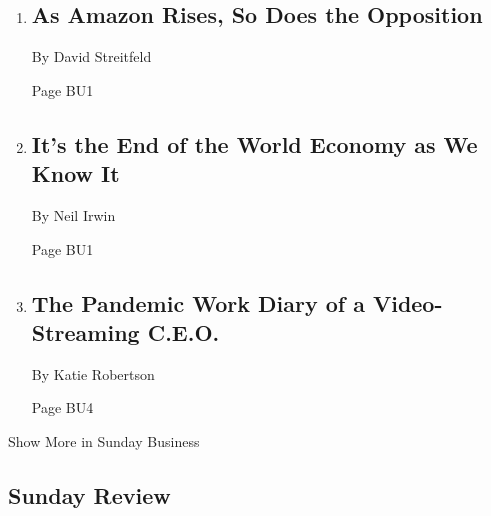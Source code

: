\begin{enumerate}
\def\labelenumi{\arabic{enumi}.}
\item
  \href{/2020/04/18/technology/athena-mitchell-amazon.html}{}

  \hypertarget{as-amazon-rises-so-does-the-opposition-1}{%
  \subsection{As Amazon Rises, So Does the
  Opposition}\label{as-amazon-rises-so-does-the-opposition-1}}

  By David Streitfeld

  Page BU1
\item
  \href{/2020/04/16/upshot/world-economy-restructuring-coronavirus.html}{}

  \hypertarget{its-the-end-of-the-world-economy-as-we-know-it-1}{%
  \subsection{It's the End of the World Economy as We Know
  It}\label{its-the-end-of-the-world-economy-as-we-know-it-1}}

  By Neil Irwin

  Page BU1
\item
  \href{/2020/04/17/business/vimeo-anjali-sud.html}{}

  \hypertarget{the-pandemic-work-diary-of-a-video-streaming-ceo}{%
  \subsection{The Pandemic Work Diary of a Video-Streaming
  C.E.O.}\label{the-pandemic-work-diary-of-a-video-streaming-ceo}}

  By Katie Robertson

  Page BU4
\end{enumerate}

Show More in Sunday Business

\hypertarget{sunday-review}{%
\subsection{Sunday Review}\label{sunday-review}}

